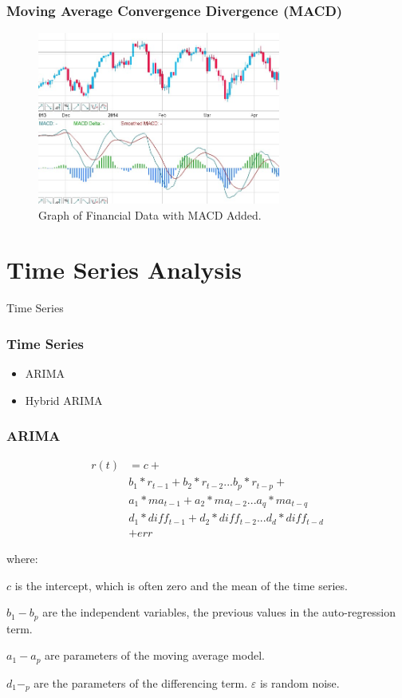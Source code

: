 \documentclass{beamer}
\begin{document}
\begin{frame}
\frametitle{Moving Average Convergence Divergence (MACD)}

\begin{figure}
\centering
\includegraphics[width=8cm]{../Figures/presentation_macd}
\caption{Graph of Financial Data with MACD Added.}
\label{fig:presentation_macd}
\end{figure}


\end{frame}

\section{Time Series Analysis} %

\begin{frame}
\Huge{\centerline{Time Series}}
\end{frame}

\begin{frame}
\frametitle{Time Series}

\begin{itemize}
\item ARIMA
\item Hybrid ARIMA
\end{itemize}

\end{frame}

\begin{frame}
\frametitle{ARIMA}
\begin{align*}
	r(t) & =   c+ \\
    & b_{1}*r_{t-1}+b_{2}*r_{t-2}...b_{p}*r_{t-p}+ \\ 
    & a_{1}*ma_{t-1}+a_{2}*ma_{t-2}...a_{q}*ma_{t-q} \\
    & d_{1}*diff_{t-1}+d_{2}*diff_{t-2} ... d_{d}*diff_{t-d} \\
    & +err
\end{align*}

where:

$ c $ is the intercept, which is often zero and the mean of the time series.

$ b_{1}-b_{p} $ are the independent variables, the previous values in the auto-regression term.

$ a_{1}-a_{p} $ are parameters of the moving average model.

$ d_{1}-_{p} $ are the parameters of the differencing term.
$ \varepsilon $ is random noise.


\end{frame}
\end{document}
